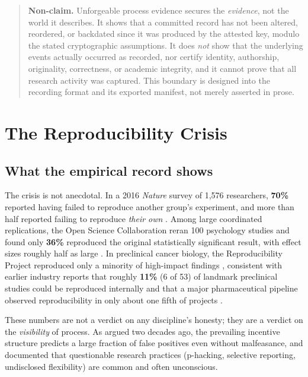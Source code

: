 \documentclass[11pt]{article}
\begin{document}
\begin{quote}
\textbf{Non-claim.} Unforgeable process evidence secures the \emph{evidence}, not the
world it describes. It shows that a committed record has not been altered, reordered,
or backdated since it was produced by the attested key, modulo the stated cryptographic
assumptions. It does \emph{not} show that the underlying events actually occurred as
recorded, nor certify identity, authorship, originality, correctness, or academic
integrity, and it cannot prove that all research activity was captured. This boundary
is designed into the recording format and its exported manifest, not merely asserted
in prose.
\end{quote}

\section{The Reproducibility Crisis}
\label{sec:crisis}

\subsection{What the empirical record shows}

The crisis is not anecdotal. In a 2016 \emph{Nature} survey of 1,576 researchers,
\textbf{70\%} reported having failed to reproduce another group's experiment, and
more than half reported failing to reproduce \emph{their own} \parencite{baker2016}.
Among large coordinated replications, the Open Science Collaboration reran 100
psychology studies and found only \textbf{36\%} reproduced the original statistically
significant result, with effect sizes roughly half as large \parencite{osc2015}. In
preclinical cancer biology, the Reproducibility Project reproduced only a minority of
high-impact findings \parencite{errington2021}, consistent with earlier industry reports
that roughly \textbf{11\%} (6 of 53) of landmark preclinical studies could be
reproduced internally \parencite{begley2012} and that a major pharmaceutical pipeline
observed reproducibility in only about one fifth of projects \parencite{prinz2011}.

These numbers are not a verdict on any discipline's honesty; they are a verdict on the
\emph{visibility} of process. As \textcite{ioannidis2005} argued two decades ago, the
prevailing incentive structure predicts a large fraction of false positives even
without malfeasance, and \textcite{john2012} documented that questionable research
practices (p-hacking, selective reporting, undisclosed flexibility) are common and
often unconscious.
\end{document}
